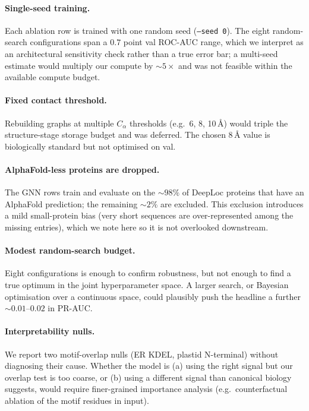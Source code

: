 \documentclass{article}
\begin{document}
\paragraph{Single-seed training.}
Each ablation row is trained with one random seed (\texttt{--seed 0}).
The eight random-search configurations span a $0.7$ point val ROC-AUC
range, which we interpret as an architectural sensitivity check rather than
a true error bar; a multi-seed estimate would multiply our compute by
$\sim\!5\times$ and was not feasible within the available compute budget.

\paragraph{Fixed contact threshold.}
Rebuilding graphs at multiple $C_\alpha$ thresholds (e.g.\ 6, 8, 10\,\AA)
would triple the structure-stage storage budget and was deferred. The
chosen 8\,\AA{} value is biologically standard but not optimised on val.

\paragraph{AlphaFold-less proteins are dropped.}
The GNN rows train and evaluate on the $\sim\!98\%$ of DeepLoc proteins
that have an AlphaFold prediction; the remaining $\sim\!2\%$ are
excluded. This exclusion introduces a mild small-protein bias (very
short sequences are over-represented among the missing entries), which
we note here so it is not overlooked downstream.

\paragraph{Modest random-search budget.}
Eight configurations is enough to confirm robustness, but not enough to
find a true optimum in the joint hyperparameter space. A larger
search, or Bayesian optimisation over a continuous space, could plausibly
push the headline a further $\sim\!0.01$--$0.02$ in PR-AUC.

\paragraph{Interpretability nulls.}
We report two motif-overlap nulls (ER KDEL, plastid N-terminal) without
diagnosing their cause. Whether the model is (a) using the right
signal but our overlap test is too coarse, or (b) using a different
signal than canonical biology suggests, would require finer-grained
importance analysis (e.g.\ counterfactual ablation of the motif residues
in input).
\end{document}
